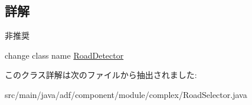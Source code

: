 \subsection{詳解}
\begin{DoxyRefDesc}{非推奨}
\item[\hyperlink{deprecated__deprecated000015}{非推奨}]change class name \hyperlink{classadf_1_1component_1_1module_1_1complex_1_1RoadDetector}{Road\+Detector} \end{DoxyRefDesc}


このクラス詳解は次のファイルから抽出されました\+:\begin{DoxyCompactItemize}
\item 
src/main/java/adf/component/module/complex/Road\+Selector.\+java\end{DoxyCompactItemize}
